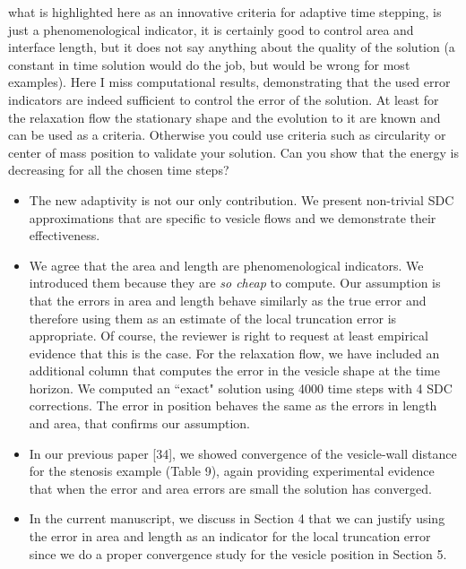 \documentclass[12pt]{article}
\newcommand{\comment}[1]{{\color{blue} #1}}
\begin{document}
\comment{what is highlighted here as an innovative criteria for adaptive
time stepping, is just a phenomenological indicator, it is certainly
good to control area and interface length, but it does not say anything
about the quality of the solution (a constant in time solution would do
the job, but would be wrong for most examples). Here I miss
computational results, demonstrating that the used error indicators are
indeed sufficient to control the error of the solution. At least for the
relaxation flow the stationary shape and the evolution to it are known
and can be used as a criteria.  Otherwise you could use criteria such as
circularity or center of mass position to validate your solution. Can
you show that the energy is decreasing for all the chosen time steps?}

\begin{itemize}
  \item The new adaptivity is not our only contribution. We present
  non-trivial SDC approximations that are specific to vesicle flows and
  we demonstrate their effectiveness. 

  \item We agree that the area and length are phenomenological
  indicators.  We introduced them because they are \emph{so cheap} to
  compute.  Our assumption is that the errors in area and length behave
  similarly as the true error and therefore using them as an estimate
  of the local truncation error is appropriate. Of course, the reviewer
  is right to request at least empirical evidence that this is the
  case.  For the relaxation flow, we have included an additional column
  that computes the error in the vesicle shape at the time horizon.  We
  computed an ``exact" solution using 4000 time steps with 4 SDC
  corrections.  The error in position behaves the same as the errors in
  length and area, that confirms our assumption.

  \item In our previous paper [34], we showed convergence of the
  vesicle-wall distance for the stenosis example (Table 9), again
  providing experimental evidence  that when the error and area errors
  are small the solution has converged. 

  \item In the current manuscript, we discuss in Section 4 that we can
  justify using the error in area and length as an indicator for the
  local truncation error since we do a proper convergence study for the
  vesicle position in Section 5.
\end{itemize}
\end{document}
